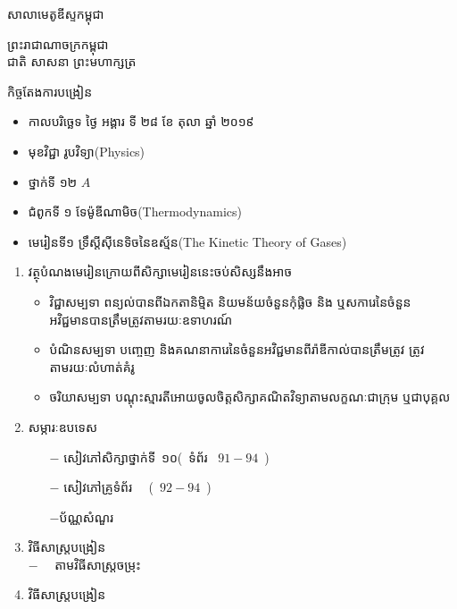 \documentclass{classes/exam}
\begin{document}
{\kml\large\noindent 
\begin{flushleft}
	សាលាមេតូឌីស្ទកម្ពុជា
\end{flushleft}
\begin{flushright}
ព្រះរាជាណាចក្រកម្ពុជា\\
ជាតិ សាសនា ព្រះមហាក្សត្រ
\end{flushright}}
\begin{center}
{\kml\LARGE កិច្ចតែងការបង្រៀន}
\end{center}
\begin{itemize}
	\item កាលបរិច្ឆេទ ​ថ្ងៃ អង្គារ ទី ២៨ ខែ តុលា ឆ្នាំ ២០១៩ 
	\item មុខវិជ្ជា រូបវិទ្យា{\en(Physics)}
	\item ថ្នាក់ទី ១២ $A$
	\item ជំពូកទី ១ ទែម៉ូឌីណាមិច{\en(Thermodynamics)}
	\item មេរៀនទី១ ទ្រឹស្តីសុីនេទិចនៃឧស្ម័ន{\en(The Kinetic Theory of Gases)}
\end{itemize}
\begin{enumerate}[I]
	\item {\kml វត្ថុបំណងមេរៀន}\quad ក្រោយពីសិក្សាមេរៀននេះចប់សិស្សនឹងអាច
\begin{itemize}
	\item វិជ្ជាសម្បទា ពន្យល់បានពីឯកតានិម្មិត និយមន័យចំនួនកុំផ្លិច និង ឬសការេនៃចំនួន\\
	អវិជ្ជមានបានត្រឹមត្រូវតាមរយៈឧទាហរណ៍
	\item បំណិនសម្បទា បញ្ចេញ និងគណនាការេនៃចំនួនអវិជ្ជមានពីរ៉ាឌីកាល់បានត្រឹមត្រូវ
	ត្រូវតាមរយៈលំហាត់គំរូ
	\item ចរិយាសម្បទា បណ្តុះស្មារតីអោយចូលចិត្តសិក្សាគណិតវិទ្យាតាម​លក្ខណៈជាក្រុម ឬជាបុគ្គល
\end{itemize}
	\item {\kml សម្ភារៈឧបទេស}\quad
\begin{itemize}
	\item [$ - $] សៀវភៅសិក្សាថ្នាក់ទី~១០\quad (~ទំព័រ ~$ 91-94 $~)
	\item [$ - $] សៀវភៅគ្រូទំព័រ ~~(~$ 92-94 $~)~~
	\item [$ - $]​ប័ណ្ណសំណួរ
\end{itemize}
	\item {\kml វិធីសាស្រ្តបង្រៀន}\\[5pt]
	$ -\quad $ តាមវិធីសាស្រ្តចម្រុះ
	\item {\kml វិធីសាស្រ្តបង្រៀន}
\end{enumerate}
\noindent
\end{document}
